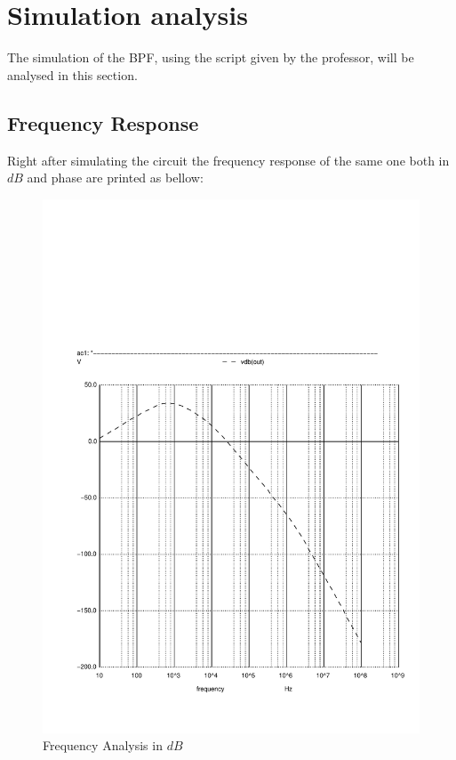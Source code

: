 \section{Simulation analysis}
\label{sec:simulation}
The simulation of the BPF, using the script given by the professor, will be analysed in this section.

\subsection{Frequency Response}
Right after simulating the circuit the frequency response of the same one both in $dB$ and phase are printed as bellow:

\begin{figure}[H] \centering
\includegraphics[width=0.7\linewidth]{../sim/vo1f.pdf}
\caption{Frequency Analysis in $dB$}
\label{fig:frequency1}
\end{figure}

